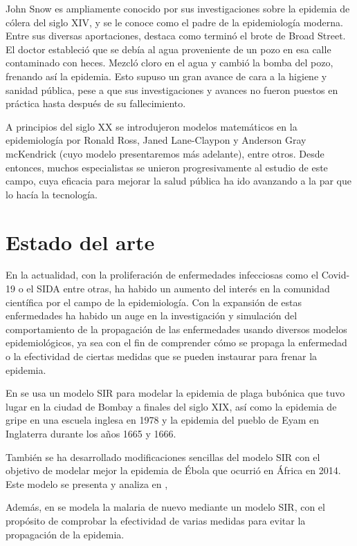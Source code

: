John Snow es ampliamente conocido por sus investigaciones sobre la epidemia de cólera del siglo XIV, y se le conoce como el padre de la epidemiología moderna. Entre sus diversas aportaciones, destaca como terminó el brote de Broad Street. El doctor estableció que se debía al agua proveniente de un pozo en esa calle contaminado con heces. Mezcló cloro en el agua y cambió la bomba del pozo, frenando así la epidemia. Esto supuso un gran avance de cara a la higiene y sanidad pública, pese a que sus investigaciones y avances no fueron puestos en práctica hasta después de su fallecimiento.

A principios del siglo XX se introdujeron modelos matemáticos en la epidemiología por Ronald Ross, Janed Lane-Claypon y Anderson Gray mcKendrick (cuyo modelo presentaremos más adelante), entre otros. Desde entonces, muchos especialistas se unieron progresivamente al estudio de este campo, cuya eficacia para mejorar la salud pública ha ido avanzando a la par que lo hacía la tecnología.

\section*{Estado del arte}

En la actualidad, con la proliferación de enfermedades infecciosas como el Covid-19 o el SIDA entre otras, ha habido un aumento del interés en la comunidad científica por el campo de la epidemiología. Con la expansión de estas enfermedades ha habido un auge en la investigación y simulación del comportamiento de la propagación de las enfermedades usando diversos modelos epidemiológicos, ya sea con el fin de comprender cómo se propaga la enfermedad o la efectividad de ciertas medidas que se pueden instaurar para frenar la epidemia.

En \cite{sulsky2012using} se usa un modelo SIR para modelar la epidemia de plaga bubónica que tuvo lugar en la ciudad de Bombay a finales del siglo XIX, así como la epidemia de gripe en una escuela inglesa en 1978 y la epidemia del pueblo de Eyam en Inglaterra durante los años 1665 y 1666.

También se ha desarrollado modificaciones sencillas del modelo SIR con el objetivo de modelar mejor la epidemia de Ébola que ocurrió en África en 2014. Este modelo se presenta y analiza en \cite{sirmodificadoebola},

Además, en \cite{kobe2015controlling} se modela la malaria de nuevo mediante un modelo SIR, con el propósito de comprobar la efectividad de varias medidas para evitar la propagación de la epidemia.

